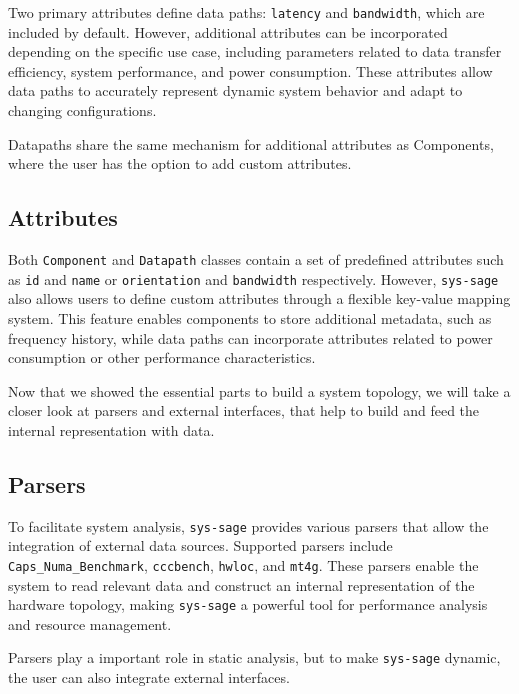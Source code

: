 Two primary attributes define data paths: \texttt{latency} and \texttt{bandwidth}, which are included by default. However, additional attributes can be incorporated depending on the specific use case, including parameters related to data transfer efficiency, system performance, and power consumption. These attributes allow data paths to accurately represent dynamic system behavior and adapt to changing configurations.\cite[see Data Path]{sys-sage-docu}

Datapaths share the same mechanism for additional attributes as Components, where the user has the option to add custom attributes.

\subsection{Attributes}

Both \texttt{Component} and \texttt{Datapath} classes contain a set of predefined attributes such as \texttt{id} and \texttt{name} or \texttt{orientation} and \texttt{bandwidth} respectively. However, \texttt{sys-sage} also allows users to define custom attributes through a flexible key-value mapping system. This feature enables components to store additional metadata, such as frequency history, while data paths can incorporate attributes related to power consumption or other performance characteristics.\cite[see Component, Datapath]{sys-sage-docu}

Now that we showed the essential parts to build a system topology, we will take a closer look at parsers and external interfaces, that help to build and feed the internal representation with data.

\subsection{Parsers}

To facilitate system analysis, \texttt{sys-sage} provides various parsers that allow the integration of external data sources. Supported parsers include \texttt{Caps\_Numa\_Benchmark}, \texttt{cccbench}, \texttt{hwloc}, and \texttt{mt4g}. These parsers enable the system to read relevant data and construct an internal representation of the hardware topology, making \texttt{sys-sage} a powerful tool for performance analysis and resource management.\cite[see Data Parsers Documentation]{sys-sage-docu}

Parsers play a important role in static analysis, but to make \texttt{sys-sage} dynamic, the user can also integrate external interfaces.

